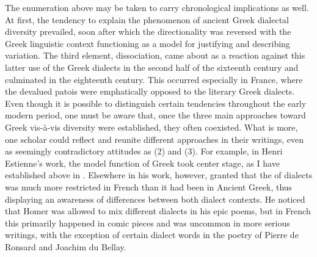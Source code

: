 The enumeration above may be taken to carry chronological implications as well. At first, the tendency to explain the phenomenon of ancient Greek dialectal diversity prevailed, soon after which the directionality was reversed with the Greek linguistic context functioning as a model for justifying and describing  variation. The third element, dissociation, came about as a reaction against this latter use of the Greek dialects in the second half of the sixteenth century and culminated in the eighteenth century. This occurred especially in France, where the devalued patois were emphatically opposed to the literary Greek dialects. Even though it is possible to distinguish certain tendencies throughout the early modern period, one must be aware that, once the three main approaches toward Greek vis-à-vis  diversity were established, they often coexisted. What is more, one scholar could reflect and reunite different approaches in their writings, even as seemingly contradictory attitudes as (2) and (3). For example, in Henri Estienne’s work, the model function of Greek took center stage, as I have established above in . Elsewhere in his work, however, \citet[93--94]{Estienne1587} granted that the  of dialects was much more restricted in French than it had been in Ancient Greek, thus displaying an awareness of differences between both dialect contexts. He noticed that Homer was allowed to mix different dialects in his epic poems, but in French this primarily happened in comic pieces and was uncommon in more serious writings, with the exception of certain dialect words in the poetry of Pierre de Ronsard and Joachim du Bellay.

